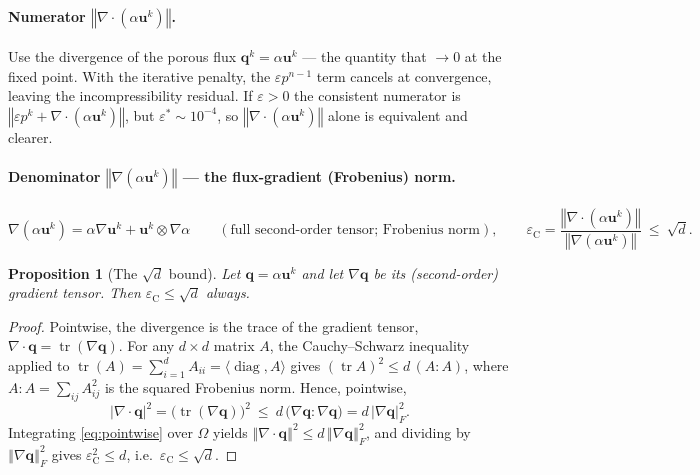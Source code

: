 \documentclass[11pt]{article}
\newcommand{\bu}{\boldsymbol{u}}
\newcommand{\bq}{\boldsymbol{q}}
\newcommand{\grad}{\nabla}
\newcommand{\divg}{\nabla\!\cdot\!}
\newcommand{\norm}[1]{\left\Vert #1\right\Vert}
\newcommand{\epsC}{\varepsilon_{\mathrm C}}
\theoremstyle{plain}
\newtheorem{proposition}{Proposition}
\theoremstyle{remark}
\begin{document}
\paragraph{Numerator $\norm{\divg(\alpha\bu^k)}$.}
Use the divergence of the porous flux $\bq^k=\alpha\bu^k$ --- the quantity that
$\to0$ at the fixed point. With the iterative penalty, the $\varepsilon p^{n-1}$
term cancels at convergence, leaving the incompressibility residual. If
$\varepsilon>0$ the consistent numerator is
$\norm{\varepsilon p^k+\divg(\alpha\bu^k)}$, but $\varepsilon^\ast\sim10^{-4}$,
so $\norm{\divg(\alpha\bu^k)}$ alone is equivalent and clearer.

\paragraph{Denominator $\norm{\grad(\alpha\bu^k)}$ --- the flux-gradient
(Frobenius) norm.}
\begin{equation}\label{eq:epsC}
  \grad(\alpha\bu^k)=\alpha\grad\bu^k+\bu^k\otimes\grad\alpha
  \qquad(\text{full second-order tensor; Frobenius norm}),
  \qquad
  \epsC=\frac{\norm{\divg(\alpha\bu^k)}}{\norm{\grad(\alpha\bu^k)}}\ \le\ \sqrt{d}.
\end{equation}

\begin{proposition}[The $\sqrt{d}$ bound]\label{prop:sqrtd}
Let $\bq=\alpha\bu^k$ and let $\grad\bq$ be its (second-order) gradient tensor.
Then $\epsC\le\sqrt{d}$ always.
\end{proposition}
\begin{proof}
Pointwise, the divergence is the trace of the gradient tensor,
$\divg\bq=\operatorname{tr}(\grad\bq)$. For any $d\times d$ matrix $A$, the
Cauchy--Schwarz inequality applied to
$\operatorname{tr}(A)=\sum_{i=1}^d A_{ii}=\langle\operatorname{diag},A\rangle$
gives $(\operatorname{tr}A)^2\le d\,(A\!:\!A)$, where $A\!:\!A=\sum_{ij}A_{ij}^2$
is the squared Frobenius norm. Hence, pointwise,
\begin{equation}\label{eq:pointwise}
  |\divg\bq|^2=\big(\operatorname{tr}(\grad\bq)\big)^2
  \ \le\ d\,\big(\grad\bq\!:\!\grad\bq\big)
  = d\,|\grad\bq|_F^2 .
\end{equation}
Integrating \eqref{eq:pointwise} over $\Omega$ yields
$\norm{\divg\bq}^2\le d\,\norm{\grad\bq}_F^2$, and dividing by
$\norm{\grad\bq}_F^2$ gives $\epsC^2\le d$, i.e.\ $\epsC\le\sqrt{d}$.
\end{proof}
\end{document}
